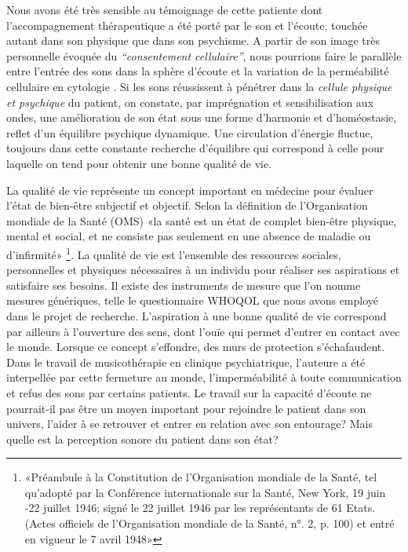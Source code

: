 Nous avons été très sensible au témoignage de cette patiente dont l'accompagnement thérapeutique a 
été porté par le son et l'écoute, touchée autant dans son physique que dans son psychisme.
A partir de son image très personnelle évoquée du \textit{``consentement cellulaire''}, nous pourrions 
faire le
parallèle entre l'entrée des sons dans la sphère d'écoute et la variation de la
perméabilité cellulaire en cytologie \cite{marieb:biologie}. Si les sons réussissent à pénétrer dans la
\textit{cellule physique et psychique} du patient,  on constate, par 
imprégnation et sensibilisation aux ondes,
une amélioration de son état %
sous une forme d'harmonie et d'homéostasie,  
\autocite[10]{marieb:biologie} 
reflet d'un équilibre psychique dynamique.  
Une circulation d'énergie  fluctue, toujours dans cette  constante recherche d'équilibre qui 
correspond  à celle pour laquelle on tend pour obtenir  une bonne qualité de vie.


La qualité de vie représente un concept important en médecine pour évaluer l'état de bien-être subjectif
et objectif. Selon la définition de l'Organisation mondiale de la Santé (OMS) «la santé est un état de 
complet bien-être physique, mental et social, et ne consiste pas seulement en une absence de maladie 
ou d’infirmité» \footnote{«Préambule à la Constitution de l'Organisation mondiale de la Santé, tel 
qu'adopté par la 
Conférence internationale sur la Santé, New York, 19 juin -22 juillet 1946; signé le 22 juillet 1946 par les 
représentants de 61 Etats. (Actes officiels de l'Organisation mondiale de la Santé, n°. 2, p. 100) et entré 
en vigueur le 7 avril 1948»}.
La  qualité de vie est 
l'ensemble 
des ressources sociales, 
personnelles et physiques nécessaires à un individu pour réaliser ses aspirations et satisfaire ses 
besoins. Il existe des instruments de mesure que l'on nomme mesures génériques, telle le 
questionnaire  WHOQOL 
que 
nous avons employé dans le projet de recherche.
L'aspiration à une bonne qualité de vie correspond par ailleurs  à l'ouverture des sens, dont l'ouïe qui 
permet d'entrer 
en contact avec le monde.
Lorsque ce concept s'effondre, des murs de protection s'échafaudent.
Dans le travail de musicothérapie en clinique psychiatrique, l'auteure a été interpellée par cette 
fermeture au monde, l'imperméabilité à 
 toute 
 communication et refus des sons par certains patients. Le travail sur la capacité d'écoute  ne 
 pourrait-il pas être un moyen important pour rejoindre le patient dans son univers, l'aider à se 
 retrouver et entrer en relation avec son entourage?  Mais quelle est la perception sonore du patient dans 
 son état?
  
